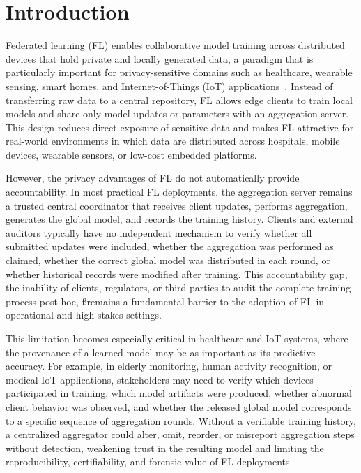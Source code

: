 \documentclass{llncs}
\begin{document}

\section{Introduction}

Federated learning (FL) enables collaborative model training across distributed devices that hold private and locally generated data, a paradigm that is particularly important for privacy-sensitive domains such as healthcare, wearable sensing, smart homes, and Internet-of-Things (IoT) applications~\cite{mcmahan2017communication,kairouz2020advances,yazici2023ehealth,singh2022framework}. Instead of transferring raw data to a central repository, FL allows edge clients to train local models and share only model updates or parameters with an aggregation server. This design reduces direct exposure of sensitive data and makes FL attractive for real-world environments in which data are distributed across hospitals, mobile devices, wearable sensors, or low-cost embedded platforms.

However, the privacy advantages of FL do not automatically provide accountability. In most practical FL deployments, the aggregation server remains a trusted central coordinator that receives client updates, performs aggregation, generates the global model, and records the training history. Clients and external auditors typically have no independent mechanism to verify whether all submitted updates were included, whether the aggregation was performed as claimed, whether the correct global model was distributed in each round, or whether historical records were modified after training. This accountability gap, the inability of clients, regulators, or third parties to audit the complete training process post hoc, ßremains a fundamental barrier to the adoption of FL in operational and high-stakes settings.

This limitation becomes especially critical in healthcare and IoT systems, where the provenance of a learned model may be as important as its predictive accuracy. For example, in elderly monitoring, human activity recognition, or medical IoT applications, stakeholders may need to verify which devices participated in training, which model artifacts were produced, whether abnormal client behavior was observed, and whether the released global model corresponds to a specific sequence of aggregation rounds. Without a verifiable training history, a centralized aggregator could alter, omit, reorder, or misreport aggregation steps without detection, weakening trust in the resulting model and limiting the reproducibility, certifiability, and forensic value of FL deployments.
\end{document}
